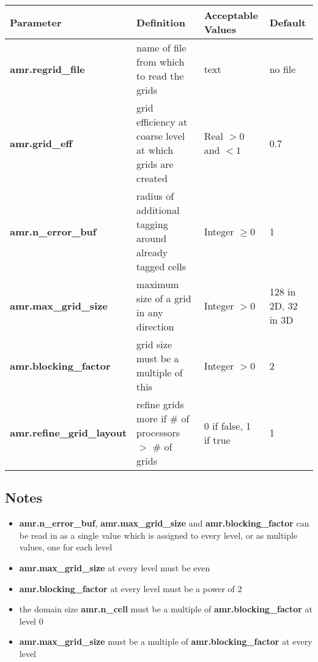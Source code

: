 \begin{table*}[h]
\begin{scriptsize}
\begin{center}
\begin{tabular}{|l|l|l|l|} \hline
Parameter & Definition & Acceptable Values &Default\\
\hline
{\bf amr.regrid\_file} & name of file from which to read the grids & text & no file  \\ 
{\bf amr.grid\_eff} & grid efficiency at coarse level at which grids are created & Real $>0$ and $<1$ & 0.7 \\ 
{\bf amr.n\_error\_buf} & radius of additional tagging around already tagged cells & Integer $\geq 0$ & 1 \\ 
{\bf amr.max\_grid\_size} & maximum size of a grid in any direction & Integer $> 0$ & 128 in 2D, 32 in 3D \\ 
{\bf amr.blocking\_factor} &  grid size must be a multiple of this & Integer $> 0$ & 2\\
{\bf amr.refine\_grid\_layout} & refine grids more if \# of processors $>$ \# of grids &  0 if false, 1 if true & 1 \\
\hline
\end{tabular}
\label{Table:GriddingInputs}
\end{center}
\end{scriptsize}
\end{table*}

\subsection{Notes}

\begin{itemize}
\item {\bf amr.n\_error\_buf}, {\bf amr.max\_grid\_size} and {\bf amr.blocking\_factor} 
can be read in as a single value which is assigned to every level, 
or as multiple values, one for each level
\item {\bf amr.max\_grid\_size} at every level must be even 
\item {\bf amr.blocking\_factor} at every level must be a power of 2
\item the domain size {\bf amr.n\_cell} 
must be a multiple of  {\bf amr.blocking\_factor} at level 0
\item {\bf amr.max\_grid\_size} must be a multiple of {\bf amr.blocking\_factor} at every level
\end{itemize}

